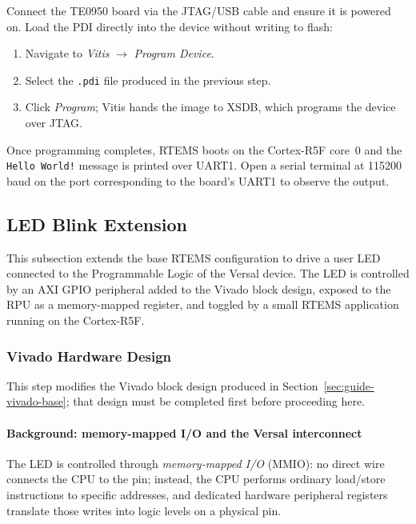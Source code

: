 \documentclass[
	a4paper,
]{CSMakotoTechnicalReport}
\begin{document}
Connect the TE0950 board via the JTAG/USB cable and ensure it is powered on.
Load the PDI directly into the device without writing to flash:

\begin{enumerate}
    \item Navigate to \textit{Vitis} $\to$ \textit{Program Device}.
    \item Select the \texttt{.pdi} file produced in the previous step.
    \item Click \textit{Program}; Vitis hands the image to XSDB, which programs the device over JTAG.
\end{enumerate}

Once programming completes, RTEMS boots on the Cortex-R5F core~0 and the \texttt{Hello World!} message is printed over UART1.
Open a serial terminal at 115200\,baud on the port corresponding to the board's UART1 to observe the output.


\subsection{LED Blink Extension}
\label{sec:guide-led}

This subsection extends the base RTEMS configuration to drive a user LED connected to the Programmable Logic of the Versal device.
The LED is controlled by an AXI GPIO peripheral added to the Vivado block design, exposed to the RPU as a memory-mapped register, and toggled by a small RTEMS application running on the Cortex-R5F.

\subsubsection{Vivado Hardware Design} %
\label{sec:guide-vivado-led}

This step modifies the Vivado block design produced in Section~\ref{sec:guide-vivado-base}; that design must be completed first before proceeding here.

\paragraph*{Background: memory-mapped I/O and the Versal interconnect}

The LED is controlled through \emph{memory-mapped I/O} (MMIO): no direct wire connects the CPU to the pin; instead, the CPU performs ordinary load/store instructions to specific addresses, and dedicated hardware peripheral registers translate those writes into logic levels on a physical pin.
\end{document}
